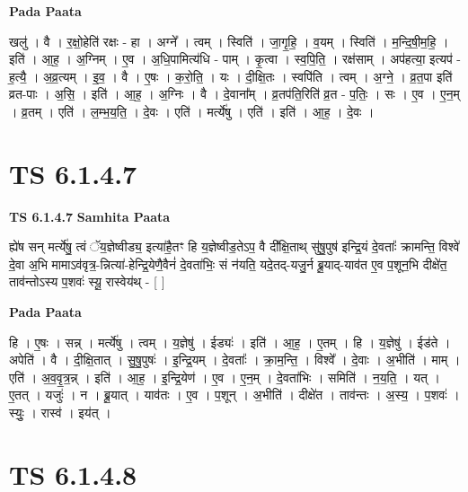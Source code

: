 \documentclass[17pt]{extarticle}
\begin{document}
\textbf{Pada Paata} \newline

खलु॑ । वै । र॒क्षो॒हेति॑ रक्षः - हा । अग्ने᳚ । त्वम् । स्विति॑ । जा॒गृ॒हि॒ । व॒यम् । स्विति॑ । म॒न्दि॒षी॒म॒हि॒ । इति॑ । आ॒ह॒ । अ॒ग्निम् । ए॒व । अ॒धि॒पामित्य॑धि - पाम् । कृ॒त्वा । स्व॒पि॒ति॒ । रक्ष॑साम् । अप॑हत्या॒ इत्यप॑ - ह॒त्यै॒ । अ॒व्र॒त्यम् । इ॒व॒ । वै । ए॒षः । क॒रो॒ति॒ । यः । दी॒क्षि॒तः । स्वपि॑ति । त्वम् । अ॒ग्ने॒ । व्र॒त॒पा इति॑ व्रत-पाः । अ॒सि॒ । इति॑ । आ॒ह॒ । अ॒ग्निः । वै । दे॒वाना᳚म् । व्र॒तप॑ति॒रिति॑ व्र॒त - प॒तिः॒ । सः । ए॒व । ए॒न॒म् । व्र॒तम् । एति॑ । ल॒म्भ॒य॒ति॒ । दे॒वः । एति॑ । मर्त्ये॑षु । एति॑ । इति॑ । आ॒ह॒ । दे॒वः ।  \newline




\section*{ TS 6.1.4.7 }

\textbf{TS 6.1.4.7 } \newline
\textbf{Samhita Paata} \newline

ह्ये॑ष सन् मर्त्ये॑षु॒ त्वं ॅय॒ज्ञेष्वीड्य॒ इत्या॑है॒तꣳ हि य॒ज्ञेष्वीड॒तेऽप॒ वै दी᳚क्षि॒ताथ् सु॑षु॒पुष॑ इन्द्रि॒यं दे॒वताः᳚ क्रामन्ति॒ विश्वे॑ दे॒वा अ॒भि मामाऽव॑वृत्र॒-न्नित्या॑-हेन्द्रि॒येणै॒वैनं॑ दे॒वता॑भिः॒ सं न॑यति॒ यदे॒तद्-यजु॒र्न ब्रू॒याद्-याव॑त ए॒व प॒शून॒भि दीक्षे॑त॒ ताव॑न्तोऽस्य प॒शवः॑ स्यू॒ रास्वेय॑थ् - [  ] \newline

\textbf{Pada Paata} \newline

हि । ए॒षः । सन्न् । मर्त्ये॑षु । त्वम् । य॒ज्ञेषु॑ । ईड्यः॑ । इति॑ । आ॒ह॒ । ए॒तम् । हि । य॒ज्ञेषु॑ । ईड॑ते । अपेति॑ । वै । दी॒क्षि॒तात् । सु॒षु॒पुषः॑ । इ॒न्द्रि॒यम् । दे॒वताः᳚ । क्रा॒म॒न्ति॒ । विश्वे᳚ । दे॒वाः । अ॒भीति॑ । माम् । एति॑ । अ॒व॒वृ॒त्र॒न्न् । इति॑ । आ॒ह॒ । इ॒न्द्रि॒येण॑ । ए॒व । ए॒न॒म् । दे॒वता॑भिः । समिति॑ । न॒य॒ति॒ । यत् । ए॒तत् । यजुः॑ । न । ब्रू॒यात् । याव॑तः । ए॒व । प॒शून् । अ॒भीति॑ । दीक्षे॑त । ताव॑न्तः । अ॒स्य॒ । प॒शवः॑ । स्युः॒ । रास्व॑ । इय॑त् ।  \newline




\section*{ TS 6.1.4.8 }
\end{document}
